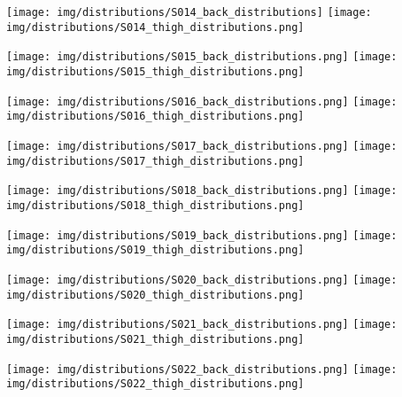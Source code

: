        \begin{multicols}{2} \centering \noindent
            \texttt{[image: img/distributions/S014\_back\_distributions]}
            \texttt{[image: img/distributions/S014\_thigh\_distributions.png]}
        \end{multicols}
        \begin{multicols}{2} \centering \noindent
            \texttt{[image: img/distributions/S015\_back\_distributions.png]}
            \texttt{[image: img/distributions/S015\_thigh\_distributions.png]}
        \end{multicols}
        \begin{multicols}{2} \centering \noindent
            \texttt{[image: img/distributions/S016\_back\_distributions.png]}
            \texttt{[image: img/distributions/S016\_thigh\_distributions.png]}
        \end{multicols}
        \pagebreak

        \begin{multicols}{2} \centering \noindent
            \texttt{[image: img/distributions/S017\_back\_distributions.png]}
            \texttt{[image: img/distributions/S017\_thigh\_distributions.png]}
        \end{multicols}
        \begin{multicols}{2} \centering \noindent
            \texttt{[image: img/distributions/S018\_back\_distributions.png]}
            \texttt{[image: img/distributions/S018\_thigh\_distributions.png]}
        \end{multicols}
        \begin{multicols}{2} \centering \noindent
            \texttt{[image: img/distributions/S019\_back\_distributions.png]}
            \texttt{[image: img/distributions/S019\_thigh\_distributions.png]}
        \end{multicols}
        \pagebreak

        \begin{multicols}{2} \centering \noindent
            \texttt{[image: img/distributions/S020\_back\_distributions.png]}
            \texttt{[image: img/distributions/S020\_thigh\_distributions.png]}
        \end{multicols}
        \begin{multicols}{2} \centering \noindent
            \texttt{[image: img/distributions/S021\_back\_distributions.png]}
            \texttt{[image: img/distributions/S021\_thigh\_distributions.png]}
        \end{multicols}
        \begin{multicols}{2} \centering \noindent
            \texttt{[image: img/distributions/S022\_back\_distributions.png]}
            \texttt{[image: img/distributions/S022\_thigh\_distributions.png]}
        \end{multicols}
        \pagebreak


